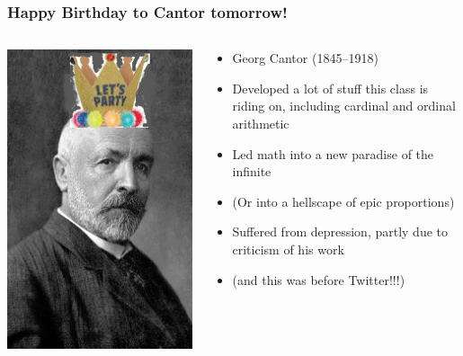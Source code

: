 \begin{frame}
  \frametitle{Happy Birthday to Cantor tomorrow!}

  \begin{columns}
    \begin{column}{.5\textwidth}
      \includegraphics[height=.8\textheight]{../assets/Cantor_old}
    \end{column}
    \begin{column}{.6\textwidth}
      \begin{itemize}[<+->]
        \item Georg Cantor (1845--1918)
        \item Developed a lot of stuff this class is riding on, including cardinal and ordinal arithmetic
\item Led math into a new paradise of the infinite
\item (Or into a hellscape of epic proportions)
\item Suffered from depression, partly due to criticism of his work
\item[] (and this was before Twitter!!!)


\end{itemize}
\end{column}
\end{columns}
\end{frame}
